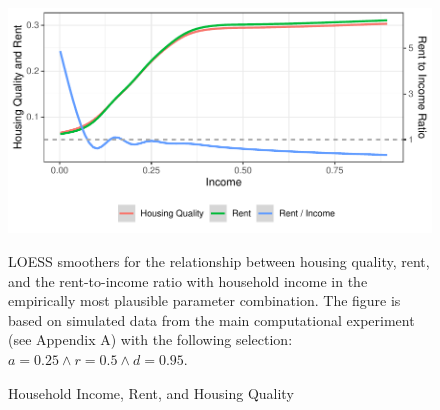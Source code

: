 \documentclass[a4paper,12pt]{article}
\begin{document}
\begin{figure}
\caption{Household Income, Rent, and Housing Quality}
\includegraphics[width=\textwidth]{./images/abm_03_inequality}

\tiny{LOESS smoothers for the relationship between housing quality, rent, and the rent-to-income ratio with household income in the empirically most plausible parameter combination. The figure is based on simulated data from the main computational experiment (see Appendix A) with the following selection: $a = 0.25 \land r = 0.5 \land d = 0.95$.} 
\label{fig:quality}
\end{figure}
\end{document}
